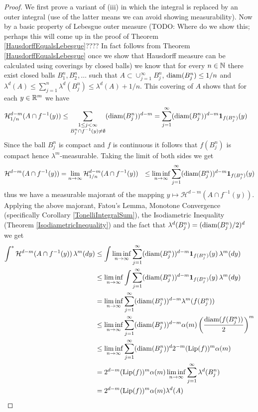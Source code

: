 \begin{proof}
We first prove a variant of (iii) in which the integral is replaced by an outer integral (use of the latter means we can avoid showing measurability).  Now by a basic property of
Lebesgue outer measure (TODO: Where do we show this; perhaps this will come up in the proof of Theorem \ref{HausdorffEqualsLebesgue}????  In fact follows from Theorem \ref{HausdorffEqualsLebesgue} once we show that Hausdorff measure can be calculated using coverings by closed balls)  we know that for every $n \in \mathbb{N}$ there exist closed balls $B^n_1, B^n_2, \dotsc$ such that
$A \subset \cup_{j=1}^\infty B^n_j$, $\operatorname*{diam}(B^n_j) \leq 1/n$ and $\lambda^d(A) \leq \sum_{j=1}^n \lambda^d(B^n_j) \leq \lambda^d(A) + 1/n$.  This covering of $A$ shows
that for each $y \in \mathbb{R}^m$ we have
\begin{align*}
\mathcal{H}^{d-m}_{1/n}(A \cap f^{-1}(y)) &\leq \sum_{\substack{1 \leq j < \infty \\ B^n_j \cap f^{-1}(y) \neq \emptyset}} (\operatorname*{diam}(B^n_j))^{d-m} = \sum_{j=1}^\infty (\operatorname*{diam}(B^n_j))^{d-m} \textbf{1}_{f(B^n_j)}(y)
\end{align*}
Since the ball $B^n_j$ is compact and $f$ is continuous it follows that $f(B^n_j)$ is compact hence $\lambda^m$-measurable.  Taking the limit of both sides we get
\begin{align*}
\mathcal{H}^{d-m}(A \cap f^{-1}(y)) &= \lim_{n \to \infty} \mathcal{H}^{d-m}_{1/n}(A \cap f^{-1}(y)) &\leq \liminf_{n \to \infty} \sum_{j=1}^\infty (\operatorname*{diam}(B^n_j))^{d-m} \textbf{1}_{f(B^n_j)}(y)
\end{align*} 
thus we have a measurable majorant of
the mapping $y \mapsto \mathcal{H}^{d-m}(A \cap f^{-1}(y))$.  Applying the above majorant, Fatou's Lemma, Monotone Convergence (specifically Corollary \ref{TonelliIntegralSum}), the Isodiametric Inequality (Theorem \ref{IsodiametricInequality}) and the fact that $\lambda^d(B^n_j) = (\operatorname*{diam}(B^n_j)/2)^d$ we get
\begin{align*}
\int^* \mathcal{H}^{d-m}(A \cap f^{-1}(y))  \, \lambda^m(dy) 
&\leq \int \liminf_{n \to \infty} \sum_{j=1}^\infty (\operatorname*{diam}(B^n_j))^{d-m} \textbf{1}_{f(B^n_j)}(y) \, \lambda^m(dy) \\
&\leq \liminf_{n \to \infty} \int \sum_{j=1}^\infty (\operatorname*{diam}(B^n_j))^{d-m} \textbf{1}_{f(B^n_j)}(y) \, \lambda^m(dy) \\
&= \liminf_{n \to \infty} \sum_{j=1}^\infty (\operatorname*{diam}(B^n_j))^{d-m} \lambda^m(f(B^n_j)) \\
&\leq \liminf_{n \to \infty} \sum_{j=1}^\infty (\operatorname*{diam}(B^n_j))^{d-m} \alpha(m) \left( \frac{\operatorname*{diam}(f(B^n_j))}{2} \right)^m \\
&\leq \liminf_{n \to \infty} \sum_{j=1}^\infty (\operatorname*{diam}(B^n_j))^{d} 2^{-m} (\operatorname*{Lip}(f))^m \alpha(m) \\
&= 2^{d-m} (\operatorname*{Lip}(f))^m \alpha(m)\liminf_{n \to \infty} \sum_{j=1}^\infty \lambda^d(B^n_j) \\
&= 2^{d-m} (\operatorname*{Lip}(f))^m \alpha(m) \lambda^d(A) \\
\end{align*}


\end{proof}
